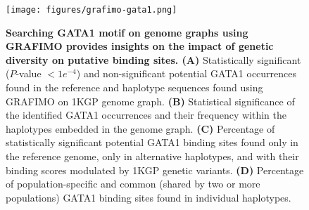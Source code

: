 \documentclass[a4paper, titlepage, openright]{book}
\newcommand{\grafimo}{GRAFIMO\xspace}
\begin{document}
\begin{figure}
    \centering
    \texttt{[image: figures/grafimo-gata1.png]}
    \caption[Searching GATA1 motif on genome graphs using \grafimo provides insights on the impact of genetic diversity on putative binding sites]{\textbf{Searching GATA1 motif on genome graphs using \grafimo provides insights on the impact of genetic diversity on putative binding sites. (A)} Statistically significant ($P$-value $< 1e^{-4}$) and non-significant potential GATA1 occurrences found in the reference and haplotype sequences found using \grafimo on 1KGP genome graph. \textbf{(B)} Statistical significance of the identified GATA1 occurrences and their frequency within the haplotypes embedded in the genome graph. \textbf{(C)} Percentage of statistically significant potential GATA1 binding sites found only in the reference genome, only in alternative haplotypes, and with their binding scores modulated by 1KGP genetic variants. \textbf{(D)} Percentage of population-specific and common (shared by two or more populations) GATA1 binding sites found in individual haplotypes.}
    \label{fig:grafimo-gata1}
\end{figure}

\end{document}
